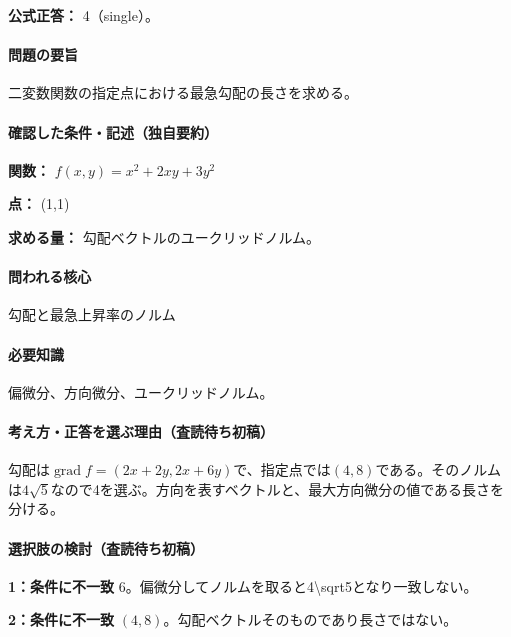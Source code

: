 \textbf{公式正答：} 4（single）。

\paragraph{問題の要旨} 二変数関数の指定点における最急勾配の長さを求める。

\paragraph{確認した条件・記述（独自要約）}\mbox{}\par

\noindent\textbf{関数：} \(f(x,y)=x^2+2xy+3y^2\)\par

\noindent\textbf{点：} (1,1)\par

\noindent\textbf{求める量：} 勾配ベクトルのユークリッドノルム。\par

\paragraph{問われる核心} 勾配と最急上昇率のノルム

\paragraph{必要知識} 偏微分、方向微分、ユークリッドノルム。

\paragraph{考え方・正答を選ぶ理由（査読待ち初稿）} 勾配は\(\operatorname{grad}f=(2x+2y,2x+6y)\)で、指定点では\((4,8)\)である。そのノルムは\(4\sqrt5\)なので4を選ぶ。方向を表すベクトルと、最大方向微分の値である長さを分ける。

\paragraph{選択肢の検討（査読待ち初稿）}\mbox{}\par

\noindent\textbf{1：条件に不一致} \(6\)。偏微分してノルムを取ると4\textbackslash{}sqrt5となり一致しない。\par

\noindent\textbf{2：条件に不一致} \((4,8)\)。勾配ベクトルそのものであり長さではない。\par

